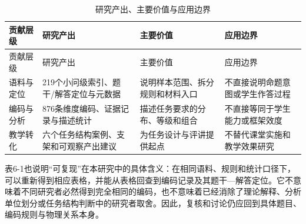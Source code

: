 \documentclass[
  12pt,
  a4paper]{ctexbook}
\begin{document}
\begin{longtable}[]{@{}
  >{\raggedright\arraybackslash}p{}
  >{\raggedright\arraybackslash}p{}
  >{\raggedright\arraybackslash}p{}
  >{\raggedright\arraybackslash}p{}@{}}
\caption{研究产出、主要价值与应用边界}\tabularnewline
\toprule\noalign{}
\rowcolor{ThesisPale}
\begin{minipage}[b]{\linewidth}\raggedright
贡献层级
\end{minipage} & \begin{minipage}[b]{\linewidth}\raggedright
研究产出
\end{minipage} & \begin{minipage}[b]{\linewidth}\raggedright
主要价值
\end{minipage} & \begin{minipage}[b]{\linewidth}\raggedright
应用边界
\end{minipage} \\
\midrule\noalign{}
\endfirsthead
\toprule\noalign{}
\rowcolor{ThesisPale}
\begin{minipage}[b]{\linewidth}\raggedright
贡献层级
\end{minipage} & \begin{minipage}[b]{\linewidth}\raggedright
研究产出
\end{minipage} & \begin{minipage}[b]{\linewidth}\raggedright
主要价值
\end{minipage} & \begin{minipage}[b]{\linewidth}\raggedright
应用边界
\end{minipage} \\
\midrule\noalign{}
\endhead
\bottomrule\noalign{}
\endlastfoot
语料与定位 & 219个小问级索引、题干/解答定位与元数据 &
说明样本范围、拆分规则和材料入口 & 不直接说明命题意图或学生作答过程 \\
编码与分析 & 876条维度编码、证据记录与描述统计 &
描述任务要求的分布、等级和组合 & 不直接等同于学生能力或框架效度 \\
教学转化 & 六个任务结构案例、支架和可观察产出建议 &
为任务设计与评讲提供起点 & 不替代课堂实施和教学效果研究 \\
\end{longtable}

表6-1也说明``可复现''在本研究中的具体含义：在相同语料、规则和统计口径下，可以重新得到相应表格，并能从表格回查到编码记录及其题干---解答定位。它不意味着不同研究者必然得到完全相同的编码，也不意味着已经消除了理论解释、分析单位划分或任务结构判断中的研究者取舍。因此，复核和讨论仍应回到具体题目、编码规则与物理关系本身。
\end{document}
